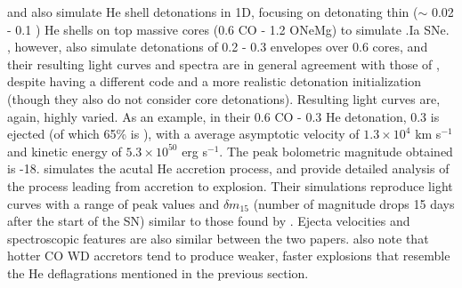 \cite{shen+10} and \cite{woosk10} also simulate He shell detonations in 1D, focusing on detonating thin ($\sim$ 0.02 - 0.1 {\Msun}) He shells on top massive cores (0.6 {\Msun} CO - 1.2 {\Msun} ONeMg) to simulate .Ia SNe.  \citeauthor{shen+10}, however, also simulate detonations of 0.2 - 0.3 {\Msun} envelopes over 0.6 {\Msun} cores, and their resulting light curves and spectra are in general agreement with those of \citeauthor{wald+10}, despite having a different code and a more realistic detonation initialization (though they also do not consider core detonations).  Resulting light curves are, again, highly varied.  As an example, in their 0.6 {\Msun} CO - 0.3 {\Msun} He detonation, 0.3 {\Msun} is ejected (of which 65\% is {\Ni}), with a average asymptotic velocity of $1.3 \times 10^{4}$ km s$^{-1}$ and kinetic energy of $5.3 \times 10^{50}$ erg s$^{-1}$.  The peak bolometric magnitude obtained is -18.  \citeauthor{woosk10} simulates the acutal He accretion process, and provide detailed analysis of the process leading from accretion to explosion.  Their simulations reproduce light curves with a range of peak values and ${\delta}m_{15}$ (number of magnitude drops 15 days after the start of the SN) similar to those found by \citeauthor{shen+10}.  Ejecta velocities and spectroscopic features are also similar between the two papers.  \cite{woosk10} also note that hotter CO WD accretors tend to produce weaker, faster explosions that resemble the He deflagrations mentioned in the previous section.


